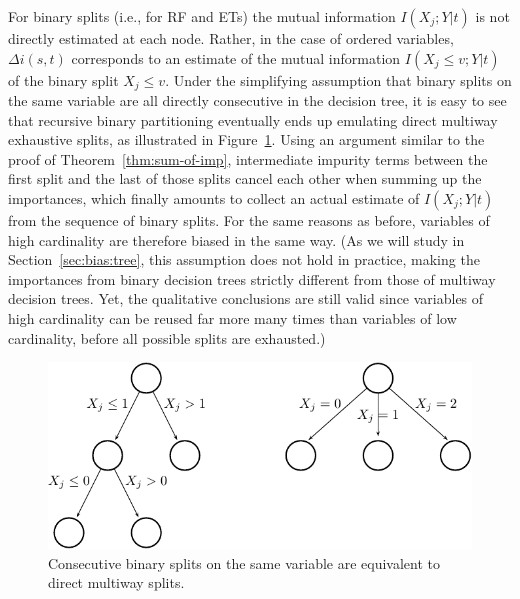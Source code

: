 For binary splits (i.e., for RF and ETs) the mutual
information $I(X_j;Y|t)$ is not directly estimated at each node. Rather, in the
case of ordered variables, $\Delta i(s, t)$ corresponds to an estimate of the
mutual information $I(X_j\leq v;Y|t)$ of the binary split $X_j \leq v$. Under
the simplifying assumption that binary splits on the same variable are all
directly consecutive in the decision tree,  it is easy to see that recursive
binary partitioning eventually ends up emulating direct multiway exhaustive
splits, as illustrated in Figure~\ref{fig:7:splits}. Using an argument similar
to the proof of Theorem~\ref{thm:sum-of-imp}, intermediate impurity terms
between the first split and the last of those splits cancel each other when
summing up the importances, which finally amounts to collect an actual estimate
of $I(X_j;Y|t)$ from the sequence of binary splits. For the same reasons as before,
variables of high cardinality are therefore biased in the same way. (As we will
study in Section~\ref{sec:bias:tree}, this assumption does not hold in
practice, making the importances from binary decision trees strictly different
from those of multiway decision trees. Yet, the qualitative conclusions are
still valid since variables of high cardinality can be reused far more many
times than variables of low cardinality, before all possible splits are
exhausted.)

\begin{figure}
    \centering
    \includegraphics[scale=1.0]{figures/ch7_splits.pdf}
    \caption{Consecutive binary splits on the same variable are equivalent to direct multiway splits.}
    \label{fig:7:splits}
\end{figure}

